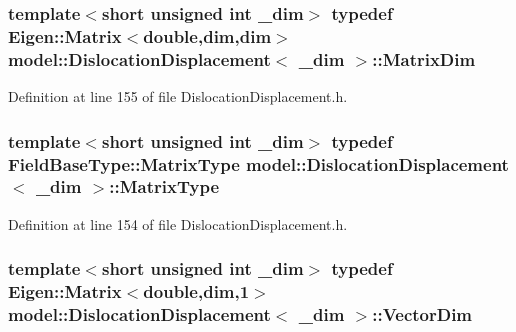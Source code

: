 \hypertarget{structmodel_1_1_dislocation_displacement_ae30a5dcabf2aa63c6d10ce23ad8eaaa3}{}
\subsubsection[{Matrix\+Dim}]{\setlength{\rightskip}{0pt plus 5cm}template$<$short unsigned int \+\_\+dim$>$ typedef Eigen\+::\+Matrix$<$double,{\bf dim},{\bf dim}$>$ {\bf model\+::\+Dislocation\+Displacement}$<$ \+\_\+dim $>$\+::{\bf Matrix\+Dim}}\label{structmodel_1_1_dislocation_displacement_ae30a5dcabf2aa63c6d10ce23ad8eaaa3}


Definition at line 155 of file Dislocation\+Displacement.\+h.

\hypertarget{structmodel_1_1_dislocation_displacement_a4eaccfbc1b90e521f051be8759244719}{}
\subsubsection[{Matrix\+Type}]{\setlength{\rightskip}{0pt plus 5cm}template$<$short unsigned int \+\_\+dim$>$ typedef {\bf Field\+Base\+Type\+::\+Matrix\+Type} {\bf model\+::\+Dislocation\+Displacement}$<$ \+\_\+dim $>$\+::{\bf Matrix\+Type}}\label{structmodel_1_1_dislocation_displacement_a4eaccfbc1b90e521f051be8759244719}


Definition at line 154 of file Dislocation\+Displacement.\+h.

\hypertarget{structmodel_1_1_dislocation_displacement_a728295e03ab8d564237fec50c71f8b50}{}
\subsubsection[{Vector\+Dim}]{\setlength{\rightskip}{0pt plus 5cm}template$<$short unsigned int \+\_\+dim$>$ typedef Eigen\+::\+Matrix$<$double,{\bf dim},1$>$ {\bf model\+::\+Dislocation\+Displacement}$<$ \+\_\+dim $>$\+::{\bf Vector\+Dim}}\label{structmodel_1_1_dislocation_displacement_a728295e03ab8d564237fec50c71f8b50}


